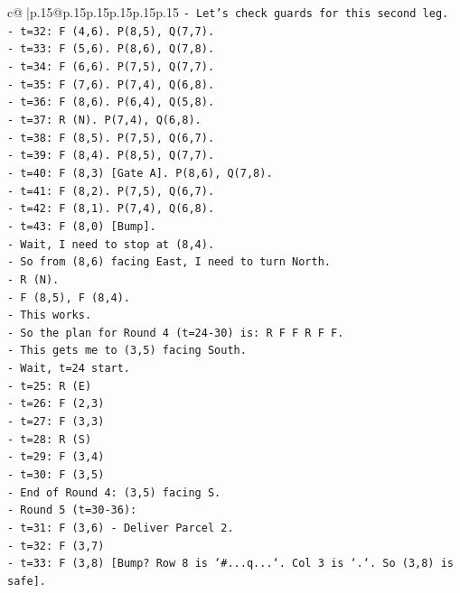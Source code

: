 \documentclass{article}
\begin{document}
{\begin{supertabular}{c@{$\;$}|p{.15\linewidth}@{}p{.15\linewidth}p{.15\linewidth}p{.15\linewidth}p{.15\linewidth}p{.15\linewidth}}
{{{\texttt{{-} Let's check guards for this second leg.} \\
\texttt{{-} t=32: F (4,6). P(8,5), Q(7,7).} \\
\texttt{{-} t=33: F (5,6). P(8,6), Q(7,8).} \\
\texttt{{-} t=34: F (6,6). P(7,5), Q(7,7).} \\
\texttt{{-} t=35: F (7,6). P(7,4), Q(6,8).} \\
\texttt{{-} t=36: F (8,6). P(6,4), Q(5,8).} \\
\texttt{{-} t=37: R (N). P(7,4), Q(6,8).} \\
\texttt{{-} t=38: F (8,5). P(7,5), Q(6,7).} \\
\texttt{{-} t=39: F (8,4). P(8,5), Q(7,7).} \\
\texttt{{-} t=40: F (8,3) {[}Gate A{]}. P(8,6), Q(7,8).} \\
\texttt{{-} t=41: F (8,2). P(7,5), Q(6,7).} \\
\texttt{{-} t=42: F (8,1). P(7,4), Q(6,8).} \\
\texttt{{-} t=43: F (8,0) {[}Bump{]}.} \\
\texttt{{-} Wait, I need to stop at (8,4).} \\
\texttt{{-} So from (8,6) facing East, I need to turn North.} \\
\texttt{{-} R (N).} \\
\texttt{{-} F (8,5), F (8,4).} \\
\texttt{{-} This works.} \\
\texttt{{-} So the plan for Round 4 (t=24{-}30) is: R F F R F F.} \\
\texttt{{-} This gets me to (3,5) facing South.} \\
\texttt{{-} Wait, t=24 start.} \\
\texttt{{-} t=25: R (E)} \\
\texttt{{-} t=26: F (2,3)} \\
\texttt{{-} t=27: F (3,3)} \\
\texttt{{-} t=28: R (S)} \\
\texttt{{-} t=29: F (3,4)} \\
\texttt{{-} t=30: F (3,5)} \\
\texttt{{-} End of Round 4: (3,5) facing S.} \\
\texttt{{-} Round 5 (t=30{-}36):} \\
\texttt{{-} t=31: F (3,6) {-} Deliver Parcel 2.} \\
\texttt{{-} t=32: F (3,7)} \\
\texttt{{-} t=33: F (3,8) {[}Bump? Row 8 is `\#...q...`. Col 3 is `.`. So (3,8) is safe{]}.} \\
}}}
\end{supertabular}}
\end{document}
